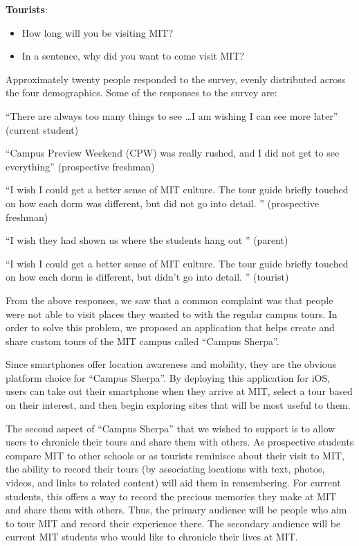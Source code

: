 \documentclass{sigchi}
\begin{document}
\textbf{Tourists}:
\begin{itemize}
	\item How long will you be visiting MIT?
	\item In a sentence, why did you want to come visit MIT?
\end{itemize}

Approximately twenty people responded to the survey, evenly distributed across the four demographics. Some of the responses to the survey are:

``There are always too many things to see \ldots I am wishing I can see more later'' (current student)

``Campus Preview Weekend (CPW) was really rushed, and I did not get to see everything'' (prospective freshman)

``I wish I could get a better sense of MIT culture. The tour guide briefly touched on how each dorm was different, but did not go into detail. '' (prospective freshman)

``I wish they had shown us where the students hang out '' (parent)

``I wish I could get a better sense of MIT culture. The tour guide briefly touched on how each dorm is different, but didn't go into detail. '' (tourist)

From the above responses, we saw that a common complaint was that people were not able to visit places they wanted to with the regular campus tours. In order to solve this problem, we proposed an application that helps create and share custom tours of the MIT campus called ``Campus Sherpa''.

Since smartphones offer location awareness and mobility, they are the obvious platform choice for ``Campus Sherpa''. By deploying this application for iOS, users can take out their smartphone when they arrive at MIT, select a tour based on their interest, and then begin exploring sites that will be most useful to them.

The second aspect of ``Campus Sherpa'' that we wished to support is to allow users to chronicle their tours and share them with others. As prospective students compare MIT to other schools or as tourists reminisce about their visit to MIT, the ability to record their tours (by associating locations with text, photos, videos, and links to related content) will aid them in remembering. For current students, this offers a way to record the precious memories they make at MIT and share them with others. Thus, the primary audience will be people who aim to tour MIT and record their experience there. The secondary audience will be current MIT students who would like to chronicle their lives at MIT.
\end{document}
